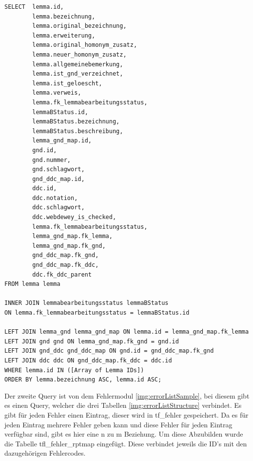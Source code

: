 \lstset{language=SQL}
\begin{lstlisting}[frame=single] 
SELECT  lemma.id,                        
        lemma.bezeichnung,                
        lemma.original_bezeichnung,     
        lemma.erweiterung,               
        lemma.original_homonym_zusatz,  
        lemma.neuer_homonym_zusatz,      
        lemma.allgemeinebemerkung,       
        lemma.ist_gnd_verzeichnet,      
        lemma.ist_geloescht,             
        lemma.verweis,                  
        lemma.fk_lemmabearbeitungsstatus, 
        lemmaBStatus.id,               
        lemmaBStatus.bezeichnung,    
        lemmaBStatus.beschreibung,              
        lemma_gnd_map.id,                 
        gnd.id,               
        gnd.nummer,                   
        gnd.schlagwort,             
        gnd_ddc_map.id,              
        ddc.id,                      
        ddc.notation,               
        ddc.schlagwort,             
        ddc.webdewey_is_checked,        
        lemma.fk_lemmabearbeitungsstatus,
        lemma_gnd_map.fk_lemma,
        lemma_gnd_map.fk_gnd,          
        gnd_ddc_map.fk_gnd,         
        gnd_ddc_map.fk_ddc,                
        ddc.fk_ddc_parent            
FROM lemma lemma
      
INNER JOIN lemmabearbeitungsstatus lemmaBStatus
ON lemma.fk_lemmabearbeitungsstatus = lemmaBStatus.id

LEFT JOIN lemma_gnd lemma_gnd_map ON lemma.id = lemma_gnd_map.fk_lemma
LEFT JOIN gnd gnd ON lemma_gnd_map.fk_gnd = gnd.id
LEFT JOIN gnd_ddc gnd_ddc_map ON gnd.id = gnd_ddc_map.fk_gnd
LEFT JOIN ddc ddc ON gnd_ddc_map.fk_ddc = ddc.id
WHERE lemma.id IN ([Array of Lemma IDs])
ORDER BY lemma.bezeichnung ASC, lemma.id ASC;

\end{lstlisting}

Der zweite Query ist von dem Fehlermodul \ref{img:errorListSample}, bei diesem gibt es einen Query, welcher die drei Tabellen \ref{img:errorListStructure} verbindet. Es gibt für jeden Fehler einen Eintrag, dieser wird in tf\_fehler gespeichert. Da es für jeden Eintrag mehrere Fehler geben kann und diese Fehler für jeden Eintrag verfügbar sind, gibt es hier eine n zu m Beziehung. Um diese Abzubilden wurde die Tabelle tfl\_fehler\_rptmap eingefügt. Diese verbindet jeweils die ID’s mit den dazugehörigen Fehlercodes. 

